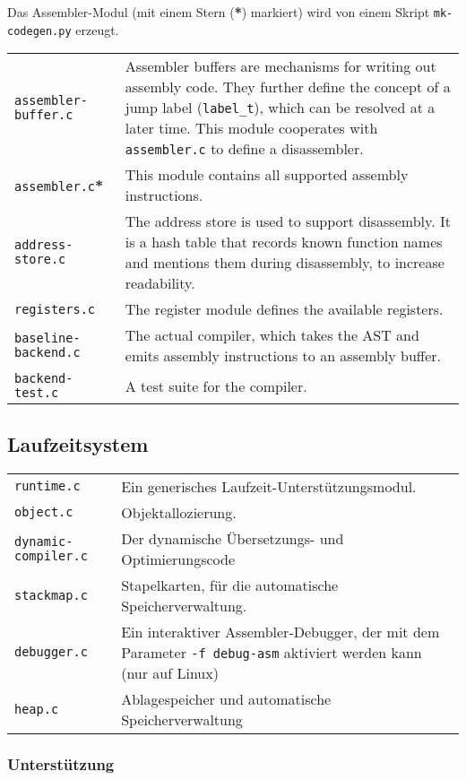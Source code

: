\documentclass[11pt,a4paper]{article}
\newcommand{\Cty}[1]{\textcolor{dblue}{\texttt{#1}}}
\begin{document}
Das Assembler-Modul (mit einem  Stern (\textbf{*}) markiert) wird von einem Skript \texttt{mk-codegen.py} erzeugt.

\begin{tabular}{p{4cm}p{12cm}}
\texttt{assembler-buffer.c} & Assembler buffers are mechanisms for writing out assembly code.  They further define the concept of a jump label (\Cty{label\_t}), which can be resolved at a later time.
This module cooperates with \texttt{assembler.c} to define a disassembler. \\
\texttt{assembler.c}\textbf{*} & This module contains all supported assembly instructions. \\
\texttt{address-store.c} & The address store is used to support disassembly.  It is a hash table that records known function names and mentions them during disassembly, to increase readability. \\
\texttt{registers.c} & The register module defines the available registers.  \\
\texttt{baseline-backend.c} & The actual compiler, which takes the AST and emits assembly instructions to an assembly buffer. \\
\texttt{backend-test.c} & A test suite for the compiler. \\
\end{tabular}

\subsection{Laufzeitsystem}
\begin{tabular}{p{4cm}p{12cm}}
\texttt{runtime.c} & Ein generisches Laufzeit-Unterstützungsmodul. \\
\texttt{object.c} & Objektallozierung. \\
\texttt{dynamic-compiler.c} & Der dynamische Übersetzungs- und Optimierungscode \\
\texttt{stackmap.c} & Stapelkarten, für die automatische Speicherverwaltung. \\
\texttt{debugger.c} & Ein interaktiver Assembler-Debugger, der mit dem Parameter \texttt{-f debug-asm} aktiviert werden kann (nur auf Linux) \\
\texttt{heap.c} & Ablagespeicher und automatische Speicherverwaltung \\
\end{tabular}

\subsubsection{Unterstützung}
\end{document}
